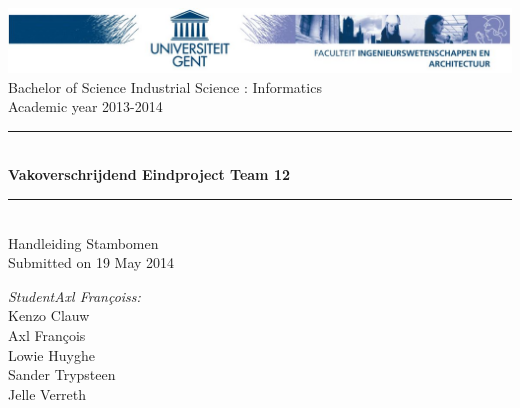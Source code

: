 \documentclass[pdftex,a4paper,12pt,twoside]{report}
\newcommand{\HRule}{\rule{\linewidth}{0.5mm}}
\newcommand{\emptypage}
{
	\newpage
	\thispagestyle{empty}
	\mbox{}
	\newpage
}
\newcommand{\studenta}{Kenzo Clauw}
\newcommand{\studentb}{Axl Fran\c{c}ois}
\newcommand{\studentc}{Lowie Huyghe}
\newcommand{\studentd}{Sander Trypsteen}
\newcommand{\studente}{Jelle Verreth}
\newcommand{\titel}{Vakoverschrijdend Eindproject Team 12}
\newcommand{\ondertitel}{Handleiding Stambomen}
\newcommand{\datum}{19 May 2014}
\newcommand{\academiejaar}{2013-2014}
\begin{document}

\begin{titlepage}
\begin{center}
\includegraphics[width=\textwidth]{images/header.jpg}\\[.5cm]
Bachelor of Science Industrial Science : Informatics\\
Academic year \academiejaar

\vfill

\HRule \\[0.4cm]
{ \huge \bfseries \titel}\\[0.4cm]
\HRule \\[0.4cm]

{\Large \ondertitel}\\[0.4cm]

Submitted on \datum

\vfill

\begin{minipage}{0.49\textwidth}
\begin{flushleft}
\emph{Student\ifdefined\studentb s\fi :}\\
\studenta \\
\studentb \\
\studentc \\
\studentd \\
\studente
\par
\end{flushleft}
\end{minipage}
\begin{minipage}{0.49\textwidth}
\begin{flushright}
\end{flushright}
\end{minipage}

\end{center}

\end{titlepage}

\emptypage
\end{document}
